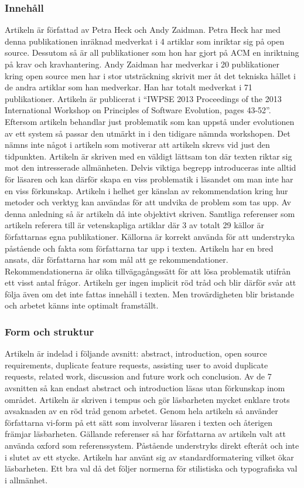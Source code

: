 \documentclass[a4paper]{article}
\begin{document}
\subsubsection{Innehåll}
Artikeln är författad av Petra Heck och Andy Zaidman. Petra Heck har med denna publikationen inräknad medverkat i 4 artiklar som inriktar sig på open source. Dessutom så är all publikationer som hon har gjort på ACM en inriktning på krav och kravhantering. Andy Zaidman har medverkar i 20 publikationer kring open source men har i stor utsträckning skrivit mer åt det tekniska hållet i de andra artiklar som han medverkar. Han har totalt medverkat i 71 publikationer. Artikeln är publicerat i “IWPSE 2013 Proceedings of the 2013 International Workshop on Principles of Software Evolution, pages 43-52”. Eftersom artikeln behandlar just problematik som kan uppstå under evolutionen av ett system så passar den utmärkt in i den tidigare nämnda workshopen. Det nämns inte något i artikeln som motiverar att artikeln skrevs vid just den tidpunkten.
Artikeln är skriven med en väldigt lättsam ton där texten riktar sig mot den intresserade allmänheten. Delvis viktiga begrepp introduceras inte alltid för läsaren och kan därför skapa en viss problematik i läsandet om man inte har en viss förkunskap. Artikeln i helhet ger känslan av rekommendation kring hur metoder och verktyg kan användas för att undvika de problem som tas upp. Av denna anledning så är artikeln då inte objektivt skriven.
Samtliga referenser som artikeln referera till är vetenskapliga artiklar där 3 av totalt 29 källor är författarnas egna publikationer. Källorna är korrekt använda för att understryka påstående och fakta som författarna tar upp i texten. 
Artikeln har en bred ansats, där författarna har som mål att ge rekommendationer. Rekommendationerna är olika tillvägagångssätt för att lösa problematik utifrån ett visst antal frågor. Artikeln ger ingen implicit röd tråd och blir därför svår att följa även om det inte fattas innehåll i texten. Men trovärdigheten blir bristande och arbetet känns inte optimalt framställt.

\subsubsection{Form och struktur}
Artikeln är indelad i följande avsnitt: abstract, introduction, open source requirements, duplicate feature requests, assisting user to avoid duplicate requests, related work, discussion and future work och conclusion. Av de 7 avsnitten så kan endast abstract och introduction läsas utan förkunskap inom området. Artikeln är skriven i tempus och gör läsbarheten mycket enklare trots avsaknaden av en röd tråd genom arbetet. Genom hela artikeln så använder författarna vi-form på ett sätt som involverar läsaren i texten och återigen främjar läsbarheten. 
Gällande referenser så har författarna av artikeln valt att använda oxford som referenssystem. Påstående understryks direkt efteråt och inte i slutet av ett stycke. 
Artikeln har använt sig av standardformatering vilket ökar läsbarheten. Ett bra val då det följer normerna för stilistiska och typografiska val i allmänhet.


\newpage


\end{document}
